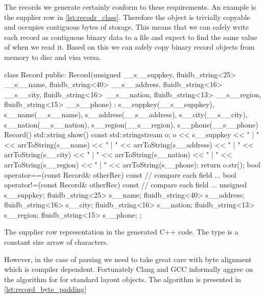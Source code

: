 The records we generate certainly conform to these requirements. An
example is the supplier row in \ref{lst:recodr_class}. Therefore the
object is trivially copyable and occupies contiguous bytes of
storage. This means that we can safely write each record  as
 contiguous binary data to a file and expect to find the
same value of  when we read it. Based on this we can safely copy
binary record objects from memory to disc and visa versa.

\begin{code}
\begin{cppcode}
class Record {
public:
  Record(unsigned __s__suppkey, fluidb_string<25> __s__name,
         fluidb_string<40> __s__address, fluidb_string<16> __s__city,
         fluidb_string<16> __s__nation, fluidb_string<13> __s__region,
         fluidb_string<15> __s__phone)
    : s__suppkey(__s__suppkey),
      s__name(__s__name),
      s__address(__s__address),
      s__city(__s__city),
      s__nation(__s__nation),
      s__region(__s__region),
      s__phone(__s__phone) {}
  Record() {}
  std::string show() const {
    std::stringstream o;
    o << s__suppkey << " | " << arrToString(s__name) << " | "
      << arrToString(s__address) << " | " << arrToString(s__city) << " | "
      << arrToString(s__nation) << " | " << arrToString(s__region) << " | "
      << arrToString(s__phone);
    return o.str();
  }
  bool operator==(const Record& otherRec) const {
    // compare each field ...
  }
  bool operator!=(const Record& otherRec) const {
    // compare each field ...
  }
  unsigned s__suppkey;
  fluidb_string<25> s__name;
  fluidb_string<40> s__address;
  fluidb_string<16> s__city;
  fluidb_string<16> s__nation;
  fluidb_string<13> s__region;
  fluidb_string<15> s__phone;
};
\end{cppcode}
  \caption{\label{lst:recodr_class}The supplier row representation in
    the generated C++ code. The  type is a
    constant size arraw of characters.}
\end{code}

However, in the case of parsing we need to take great care with byte
alignment which is compiler dependent. Fortunately Clang and GCC
informally aggree on the algorithm for  for
standard layout objects. The algorithm is presented in
\ref{lst:record_byte_padding}

